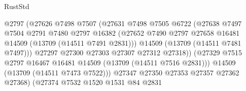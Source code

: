 \begin{lexlean}{RustStd}
\begin{coremodule}
                                        @2797
                                        (@27626
                                          @7498
                                          @7507
                                          (@27631
                                            @7498
                                            @7505
                                            @6722
                                            (@27638
                                              @7497
                                              @7504
                                              @2791
                                              @7480
                                              @2797
                                              @16382
                                              (@27652
                                                @7490
                                                @2797
                                                @27658
                                                @16481
                                                @14509
                                                (@13709 (@14511 @7491 @2831)))
                                              @14509
                                              (@13709 (@14511 @7481 @7497)))
                                            @27297
                                            @27300
                                            @27303
                                            @27307
                                            @27312
                                            @27318))
                                        (@27329
                                          @7515
                                          @2797
                                          @16467
                                          @16481
                                          @14509
                                          (@13709 (@14511 @7516 @2831)))
                                        @14509
                                        (@13709 (@14511 @7473 @7522)))
                                      @27347
                                      @27350
                                      @27353
                                      @27357
                                      @27362
                                      @27368)
                                    (@27374
                                      @7532
                                      @1520
                                      @1531
                                      @84
                                      @2831

\end{coremodule}
\end{lexlean}
